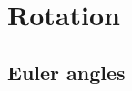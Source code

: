 \documentclass[modern]{aastex61}
\begin{document}
\section{Rotation}
\label{sec:rotation}

\subsection{Euler angles}
\label{sec:euler}
\end{document}

